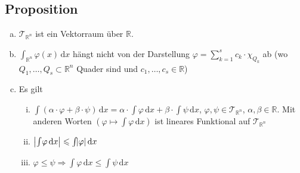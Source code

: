 \subsection[Proposition: Eigenschaften von Treppenfunktionen]{Proposition} %
\label{sub:33}
\begin{enumerate}[a)]
	\item $\mathcal{T}_{\mathds{R}^n}$ ist ein Vektorraum über $\mathds{R}$.
	\item $\int_{\mathds{R}^n} \! \varphi(x)  \, \mathrm{d}x$ hängt nicht von der Darstellung $\varphi = \sum_{k=1}^{s} c_k \cdot \chi_{Q_k}$ ab (wo 
	$Q_1, \ldots , Q_s \subset \mathds{R}^n$ Quader sind und $c_1, \ldots , c_s \in \mathds{R}$)
	\item Es gilt 
	\begin{enumerate}[(i)]
		\item $\int(\alpha \cdot \varphi + \beta \cdot \psi)  \, \mathrm{d}x  = \alpha \cdot  \int \! \varphi  \, \mathrm{d}x  + \beta \cdot \int\! \psi  \, \mathrm{d}x  $,
		$\varphi, \psi \in \mathcal{T}_{\mathds{R}^n}$, $\alpha, \beta \in \mathds{R}$. Mit anderen Worten $(\varphi \mapsto \int\! \varphi  \, \mathrm{d}x )$ ist lineares
		Funktional auf $\mathcal{T}_{\mathds{R}^n}$
		\item $\abs*{\int\! \varphi  \, \mathrm{d}x } \le \int \! \abs*{\varphi}  \, \mathrm{d}x   $
		\item $\varphi \le \psi \Longrightarrow \int \! \varphi  \, \mathrm{d}x  \le \int\! \psi  \, \mathrm{d}x  $
	\end{enumerate}
\end{enumerate}

